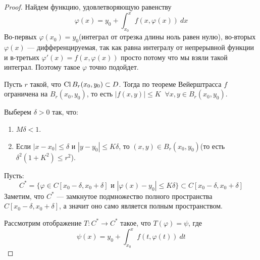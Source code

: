 \begin{proof}
Найдем функцию, удовлетворяющую равенству
\begin{equation*}
    \varphi(x) = y_0 + \int_{x_0}^{x} f(x, \varphi(x)) \: dx
\end{equation*}
Во-первых $\varphi(x_0) = y_0$(интеграл от отрезка длины ноль равен нулю), во-вторых $\varphi(x)$ --- дифференцируемая, так как равна интегралу от непрерывной функции и в-третьих $\varphi'(x) = f(x, \varphi(x))$ просто потому что мы взяли такой интеграл. Поэтому такое $\varphi$ точно подойдет.

Пусть $r$ такой, что $\operatorname{Cl} B_r(x_0, y_0) \subset D$. Тогда по теореме Вейерштрасса $f$ ограничена на $B_r(x_0, y_0)$, то есть $|f(x, y)| \leqslant K \;\; \forall x, y \in B_r(x_0, y_0)$.

Выберем $\delta > 0$ так, что:
\begin{enumerate}
    \item $M \delta < 1$.
    \item Если $|x - x_0| \leqslant \delta$ и $|y - y_0| \leqslant K \delta$, то $(x, y) \in B_r(x_0, y_0)$(то есть $\delta^2(1 + K^2) \leqslant r^2$).
\end{enumerate}

Пусть:
\begin{equation*}
    C^{*} = \{\varphi \in C[x_0 - \delta, x_0 + \delta]\text{ и } |\varphi(x) - y_0| \leqslant K\delta\} \subset C[x_0 - \delta, x_0 + \delta]
\end{equation*}
Заметим, что $C^{*}$ --- замкнутое подмножество полного пространства $C[x_0 - \delta, x_0 + \delta]$, а значит оно само является полным пространством.

Рассмотрим отображение $T\colon C^{*} \to C^{*}$ такое, что $T(\varphi) = \psi$, где
\begin{equation*}
    \psi(x) = y_0 + \int_{x_0}^{x} f(t, \varphi(t)) \: dt
\end{equation*}


\end{proof}
